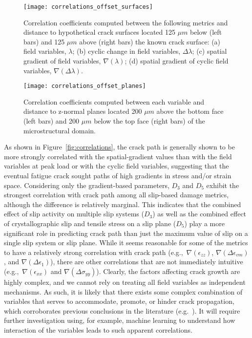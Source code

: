 \begin{figure}[t]
  \centering
    \texttt{[image: correlations\_offset\_surfaces]}
    \caption{Correlation coefficients computed between the following metrics and distance to hypothetical crack surfaces located 125 $\mu m$ below (left bars) and 125 $\mu m$ above (right bars) the known crack surface: (a) field variables, $\lambda$; (b) cyclic change in field variables, $\Delta\lambda$; (c) spatial gradient of field variables, $\nabla(\lambda)$; (d) spatial gradient of cyclic field variables, $\nabla(\Delta\lambda)$.}
    \label{fig:correlations_offset_surfaces}
\end{figure}

\begin{figure}[t]
  \centering
    \texttt{[image: correlations\_offset\_planes]}
    \caption{Correlation coefficients computed between each variable and distance to z-normal planes located 200 $\mu m$ above the bottom face (left bars) and 200 $\mu m$ below the top face (right bars) of the microstructural domain.}
    \label{fig:correlations_offset_planes}
\end{figure}

As shown in Figure~\ref{fig:correlations}, the crack path is generally shown to be more strongly correlated with the spatial-gradient values than with the field variables at peak load or with the cyclic field variables, suggesting that the eventual fatigue crack sought paths of high gradients in stress and/or strain space. Considering only the gradient-based parameters, $D_3$ and $D_5$ exhibit the strongest correlation with crack path among all slip-based damage metrics, although the difference is relatively marginal. This indicates that the combined effect of slip activity on multiple slip systems ($D_3$) as well as the combined effect of crystallographic slip and tensile stress on a slip plane ($D_5$) play a more significant role in predicting crack path than just the maximum value of slip on a single slip system or slip plane. While it seems reasonable for some of the metrics to have a relatively strong correlation with crack path (e.g.,~$\nabla(\epsilon_{zz})$, $\nabla(\Delta\epsilon_{vm})$, and $\nabla(\Delta\epsilon_{1})$), there are other correlations that are not immediately intuitive (e.g.,~$\nabla(\epsilon_{xx})$ and $\nabla(\Delta\sigma_{yy})$). Clearly, the factors affecting crack growth are highly complex, and we cannot rely on treating all field variables as independent mechanisms. As such, it is likely that there exists some complex combination of variables that serves to accommodate, promote, or hinder crack propagation, which corroborates previous conclusions in the literature (e.g.~\cite{McDowell_2010,Hochhalter_2011,Rovinelli_2017}). It will require further investigation using, for example, machine learning to understand how interaction of the variables leads to such apparent correlations. 

